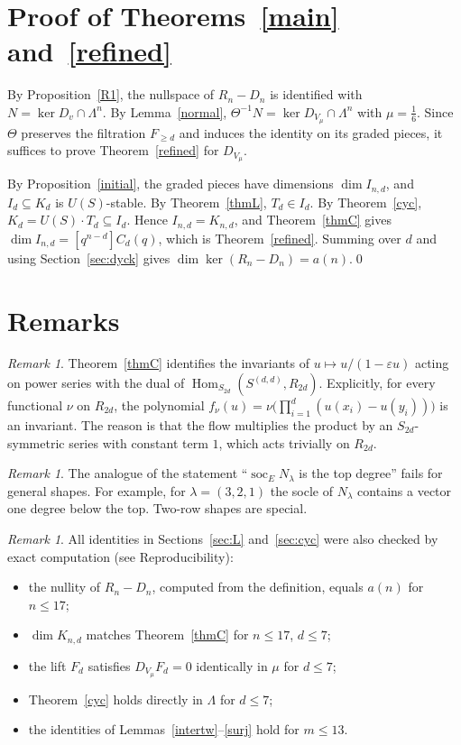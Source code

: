 \documentclass[11pt]{article}
\theoremstyle{definition}
\theoremstyle{remark}
\newtheorem{remark}[theorem]{Remark}
\newcommand{\La}{\Lambda}
\newcommand{\Hom}{\operatorname{Hom}}
\newcommand{\soc}{\operatorname{soc}}
\begin{document}
\section{Proof of Theorems~\ref{main} and~\ref{refined}}\label{sec:proof}

By Proposition~\ref{R1}, the nullspace of $R_n-D_n$ is identified with $N=\ker D_v\cap\La^n$. By
Lemma~\ref{normal}, $\Theta^{-1}N=\ker D_{V_\mu}\cap\La^n$ with $\mu=\frac16$. Since $\Theta$ preserves the
filtration $F_{\ge d}$ and induces the identity on its graded pieces, it suffices to prove Theorem~\ref{refined}
for $D_{V_\mu}$.

By Proposition~\ref{initial}, the graded pieces have dimensions $\dim I_{n,d}$, and $I_d\subseteq K_d$ is
$U(S)$-stable. By Theorem~\ref{thmL}, $T_d\in I_d$. By Theorem~\ref{cyc}, $K_d=U(S)\cdot T_d\subseteq I_d$. Hence
$I_{n,d}=K_{n,d}$, and Theorem~\ref{thmC} gives $\dim I_{n,d}=[q^{n-d}]C_d(q)$, which is Theorem~\ref{refined}.
Summing over $d$ and using Section~\ref{sec:dyck} gives $\dim\ker(R_n-D_n)=a(n)$.\qed

\section{Remarks}

\begin{remark}
Theorem~\ref{thmC} identifies the invariants of $u\mapsto u/(1-\varepsilon u)$ acting on power series with the
dual of $\Hom_{S_{2d}}(S^{(d,d)},R_{2d})$. Explicitly, for every functional $\nu$ on $R_{2d}$, the polynomial
$f_\nu(u)=\nu\bigl(\prod_{i=1}^d(u(x_i)-u(y_i))\bigr)$ is an invariant. The reason is that the flow multiplies the
product by an $S_{2d}$-symmetric series with constant term $1$, which acts trivially on $R_{2d}$.
\end{remark}

\begin{remark}
The analogue of the statement ``$\soc_E N_\lambda$ is the top degree'' fails for general shapes. For example, for
$\lambda=(3,2,1)$ the socle of $N_\lambda$ contains a vector one degree below the top. Two-row shapes are special.
\end{remark}

\begin{remark}
All identities in Sections~\ref{sec:L} and~\ref{sec:cyc} were also checked by exact computation (see
Reproducibility):
\begin{itemize}
\item the nullity of $R_n-D_n$, computed from the definition, equals $a(n)$ for $n\le17$;
\item $\dim K_{n,d}$ matches Theorem~\ref{thmC} for $n\le17$, $d\le7$;
\item the lift $F_d$ satisfies $D_{V_\mu}F_d=0$ identically in $\mu$ for $d\le7$;
\item Theorem~\ref{cyc} holds directly in $\La$ for $d\le7$;
\item the identities of Lemmas~\ref{intertw}--\ref{surj} hold for $m\le13$.
\end{itemize}
\end{remark}
\end{document}
